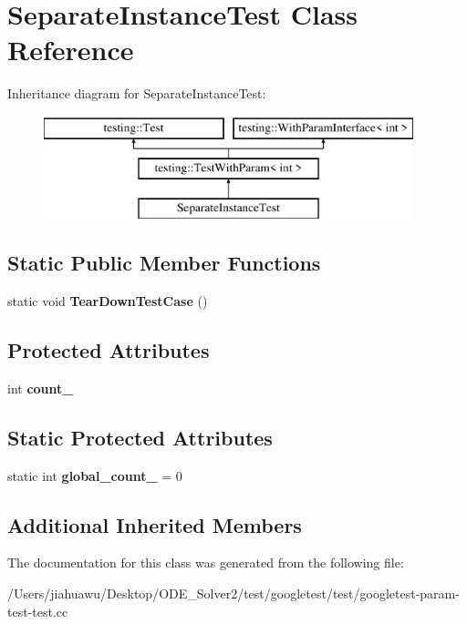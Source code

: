 \hypertarget{class_separate_instance_test}{}\section{Separate\+Instance\+Test Class Reference}
\label{class_separate_instance_test}
Inheritance diagram for Separate\+Instance\+Test\+:\begin{figure}[H]
\begin{center}
\leavevmode
\includegraphics[height=3.000000cm]{class_separate_instance_test}
\end{center}
\end{figure}
\subsection*{Static Public Member Functions}
\begin{DoxyCompactItemize}
\item 
\mbox{\label{class_separate_instance_test_a7c4a72843a7c4a9be56adef27ecd33c7}} 
static void {\bfseries Tear\+Down\+Test\+Case} ()
\end{DoxyCompactItemize}
\subsection*{Protected Attributes}
\begin{DoxyCompactItemize}
\item 
\mbox{\label{class_separate_instance_test_a04af1b3b711671ecb0778af1330a740f}} 
int {\bfseries count\+\_\+}
\end{DoxyCompactItemize}
\subsection*{Static Protected Attributes}
\begin{DoxyCompactItemize}
\item 
\mbox{\label{class_separate_instance_test_a79db6d4cdd6c99b256439cc020f782ef}} 
static int {\bfseries global\+\_\+count\+\_\+} = 0
\end{DoxyCompactItemize}
\subsection*{Additional Inherited Members}


The documentation for this class was generated from the following file\+:\begin{DoxyCompactItemize}
\item 
/\+Users/jiahuawu/\+Desktop/\+O\+D\+E\+\_\+\+Solver2/test/googletest/test/googletest-\/param-\/test-\/test.\+cc\end{DoxyCompactItemize}
